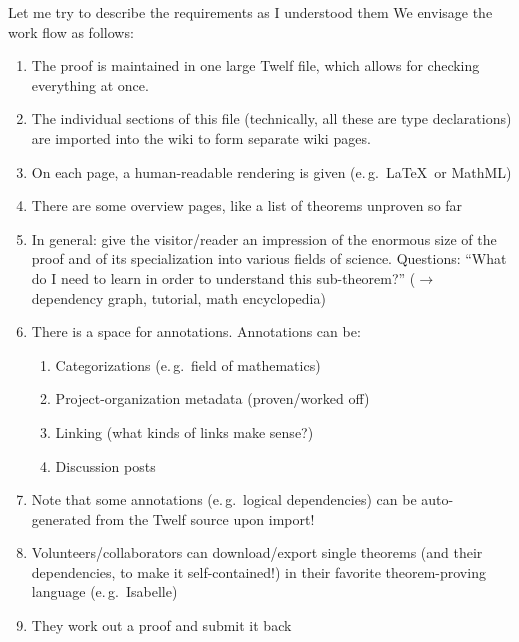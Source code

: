 \documentclass{llncs}
\begin{document}
\begin{newpart}{Let me try to describe the requirements as I understood them}
  We envisage the work flow as follows:
  \begin{enumerate}
  \item The proof is maintained in one large Twelf file, which allows for checking
    everything at once.
  \item The individual sections of this file (technically, all these are type
    declarations) are imported into the wiki to form separate wiki pages.
  \item On each page, a human-readable rendering is given (e.\,g.\ \LaTeX\ or MathML)
  \item There are some overview pages, like a list of theorems unproven so
    far
  \item In general: give the visitor/reader an impression of the enormous size of the
    proof and of its specialization into various fields of science.  Questions: ``What do
    I need to learn in order to understand this sub-theorem?'' ($\to$ dependency graph,
    tutorial, math encyclopedia)
  \item There is a space for annotations.  Annotations can be:
    \begin{enumerate}
    \item Categorizations (e.\,g.\ field of mathematics)
    \item Project-organization metadata (proven/worked off)
    \item Linking (what kinds of links make sense?)
    \item Discussion posts
    \end{enumerate}
  \item Note that some annotations (e.\,g.\ logical dependencies) can be auto-generated
    from the Twelf source upon import!
  \item Volunteers/collaborators can download/export single theorems (and their
    dependencies, to make it self-contained!) in their favorite theorem-proving language
    (e.\,g.\ Isabelle)
  \item They work out a proof and submit it back
  \end{enumerate}
\end{newpart}
\end{document}

